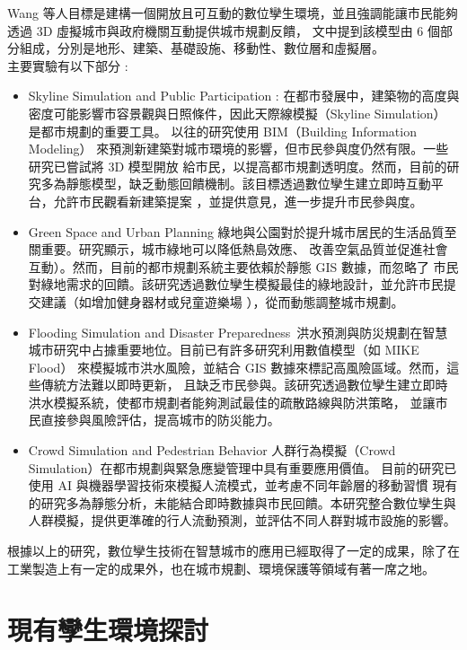 Wang 等人\cite{White2021DigitalTwin}目標是建構一個開放且可互動的數位孿生環境，並且強調能讓市民能夠透過 3D 虛擬城市與政府機關互動提供城市規劃反饋，
文中提到該模型由 6 個部分組成，分別是地形、建築、基礎設施、移動性、數位層和虛擬層。\\
主要實驗有以下部分 :
\begin{itemize}
      \item Skyline Simulation and Public Participation :
            在都市發展中，建築物的高度與密度可能影響市容景觀與日照條件，因此天際線模擬（Skyline Simulation） 是都市規劃的重要工具。
            以往的研究使用 BIM（Building Information Modeling） 來預測新建築對城市環境的影響，但市民參與度仍然有限。一些研究已嘗試將 3D 模型開放
            給市民，以提高都市規劃透明度。然而，目前的研究多為靜態模型，缺乏動態回饋機制。該目標透過數位孿生建立即時互動平台，允許市民觀看新建築提案
            ，並提供意見，進一步提升市民參與度。
      \item Green Space and Urban Planning
            綠地與公園對於提升城市居民的生活品質至關重要。研究顯示，城市綠地可以降低熱島效應、
            改善空氣品質並促進社會互動）。然而，目前的都市規劃系統主要依賴於靜態 GIS 數據，而忽略了
            市民對綠地需求的回饋。該研究透過數位孿生模擬最佳的綠地設計，並允許市民提交建議（如增加健身器材或兒童遊樂場
            ），從而動態調整城市規劃。
      \item Flooding Simulation and Disaster Preparedness\
            洪水預測與防災規劃在智慧城市研究中占據重要地位。目前已有許多研究利用數值模型（如 MIKE Flood）
            來模擬城市洪水風險，並結合 GIS 數據來標記高風險區域。然而，這些傳統方法難以即時更新，
            且缺乏市民參與。該研究透過數位孿生建立即時洪水模擬系統，使都市規劃者能夠測試最佳的疏散路線與防洪策略，
            並讓市民直接參與風險評估，提高城市的防災能力。
      \item Crowd Simulation and Pedestrian Behavior
            人群行為模擬（Crowd Simulation）在都市規劃與緊急應變管理中具有重要應用價值。
            目前的研究已使用 AI 與機器學習技術來模擬人流模式，並考慮不同年齡層的移動習慣
            現有的研究多為靜態分析，未能結合即時數據與市民回饋。本研究整合數位孿生與人群模擬，提供更準確的行人流動預測，並評估不同人群對城市設施的影響。
\end{itemize}
根據以上的研究，數位孿生技術在智慧城市的應用已經取得了一定的成果，除了在工業製造上有一定的成果外，也在城市規劃、環境保護等領域有著一席之地。
\section{現有孿生環境探討}
